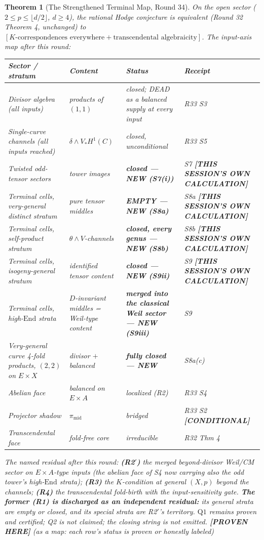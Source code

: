 \documentclass[11pt]{article}
\newtheorem{theorem}{Theorem}
\newcommand{\PROVEN}{\textbf{[PROVEN HERE]}}
\newcommand{\COND}{\textbf{[CONDITIONAL]}}
\newcommand{\MINE}{\textbf{[THIS SESSION'S OWN CALCULATION]}}
\newcommand{\End}{\mathrm{End}}
\begin{document}
\begin{theorem}[The Strengthened Terminal Map, Round 34]\label{thm:s10}
On the open sector ($2\le p\le\lfloor d/2\rfloor$, $d\ge4$), the
rational Hodge conjecture is equivalent (Round 32 Theorem 4, unchanged)
to $[K\text{-correspondences everywhere}+\text{transcendental
algebraicity}]$. The input-axis map after this round:
\begin{center}
\small
\begin{tabular}{@{}p{4.3cm}p{4.4cm}p{3.4cm}p{2.5cm}@{}}
\toprule
\textbf{Sector / stratum} & \textbf{Content} & \textbf{Status} &
\textbf{Receipt}\\
\midrule
Divisor algebra (all inputs) & products of $(1,1)$ & closed; DEAD as a
balanced supply at every input & R33 S3 \\
Single-curve channels (all inputs reached) & $\delta\wedge V_*H^1(C)$
& closed, unconditional & R33 S5\\
Twisted odd-tensor sectors & tower images & \textbf{closed --- NEW
(S7(i))} & S7 \MINE{}\\
Terminal cells, very-general distinct stratum & pure tensor middles &
\textbf{EMPTY --- NEW (S8a)} & S8a \MINE{}\\
Terminal cells, self-product stratum & $\theta\wedge V$-channels &
\textbf{closed, every genus --- NEW (S8b)} & S8b \MINE{}\\
Terminal cells, isogeny-general stratum & identified tensor content &
\textbf{closed --- NEW (S9ii)} & S9 \MINE{}\\
Terminal cells, high-$\End$ strata & $D$-invariant middles = Weil-type
content & \textbf{merged into the classical Weil sector --- NEW (S9iii)}
& S9\\
Very-general curve 4-fold products, $(2,2)$ on $E\times X$ & divisor
$+$ balanced & \textbf{fully closed --- NEW} & S8a(c)\\
Abelian face & balanced on $E\times A$ & localized (R2) & R33 S4\\
Projector shadow & $\pi_{\mathrm{mid}}$ & bridged & R33 S2 \COND{}\\
Transcendental face & fold-free core & irreducible & R32 Thm 4\\
\bottomrule
\end{tabular}
\end{center}
The named residual after this round: \textbf{(R2$'$)} the merged
beyond-divisor Weil/CM sector on $E\times A$-type inputs (the abelian
face of S4 now carrying also the odd tower's high-$\End$ strata);
\textbf{(R3)} the $K$-condition at general $(X,p)$ beyond the channels;
\textbf{(R4)} the transcendental fold-birth with the input-sensitivity
gate. \textbf{The former (R1) is discharged as an independent residual:}
its general strata are empty or closed, and its special strata are
R2$'$'s territory. $\mathrm{Q1}$ remains proven and certified; Q2 is
not claimed; the closing string is not emitted.
\PROVEN{} (as a map: each row's status is proven or honestly labeled)
\end{theorem}
\end{document}
